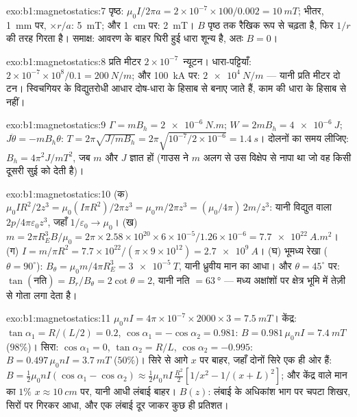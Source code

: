 \begin{solution}{exo:b1:magnetostatics:7}
पृष्ठ: $\mu_0I/2\pi a = 2 \times 10^{-7} \times 100/0.002 = \qty{10}{mT}$; भीतर,
\qty{1}{mm} पर, $\times r/a$: \qty{5}{mT}; और \qty{1}{cm} पर: \qty{2}{mT}। $B$ पृष्ठ तक
रैखिक रूप से चढ़ता है, फिर $1/r$ की तरह गिरता है। समाक्ष: आवरण के बाहर घिरी
हुई धारा शून्य है, अतः $B = 0$।
\end{solution}

\begin{solution}{exo:b1:magnetostatics:8}
प्रति मीटर $2 \times 10^{-7}$~न्यूटन। धारा-पट्टियाँ: $2 \times 10^{-7} \times 10^8/0.1 = \qty{200}{N/m}$;
और \qty{100}{kA} पर: $\qty{2e4}{N/m}$ --- यानी प्रति मीटर दो टन। स्विचगियर
के विद्युतरोधी आधार दोष-धारा के हिसाब से बनाए जाते हैं, काम की धारा के
हिसाब से नहीं।
\end{solution}

\begin{solution}{exo:b1:magnetostatics:9}
$\Gamma = mB_h = \qty{2e-6}{N.m}$; $W = 2mB_h = \qty{4e-6}{J}$; $J\ddot\theta =
-mB_h\theta$: $T = 2\pi\sqrt{J/mB_h} = 2\pi\sqrt{10^{-7}/2 \times 10^{-6}} =
\qty{1.4}{s}$। दोलनों का समय लीजिए: $B_h = 4\pi^2J/mT^2$, जब $m$ और
$J$ ज्ञात हों (गाउस ने $m$ अलग से उस विक्षेप से नापा था जो वह किसी
दूसरी सुई को देती है)।
\end{solution}

\begin{solution}{exo:b1:magnetostatics:10}
(क) $\mu_0IR^2/2z^3 = \mu_0(I\pi R^2)/2\pi z^3 = \mu_0m/2\pi z^3 = (\mu_0/4\pi)\,2m/z^3$:
यानी विद्युत वाला $2p/4\pi\varepsilon_0z^3$, जहाँ $1/\varepsilon_0 \to \mu_0$। (ख) $m = 2\pi R_E^3B/
\mu_0 = 2\pi \times 2.58 \times 10^{20} \times 6 \times 10^{-5}/1.26 \times 10^{-6} = \qty{7.7e22}{A.m^2}$।
(ग) $I = m/\pi R^2 = 7.7 \times 10^{22}/(\pi \times 9 \times 10^{12}) = \qty{2.7e9}{A}$। (घ)
भूमध्य रेखा ($\theta = 90^\circ$): $B_\theta = \mu_0m/4\pi R_E^3 = \qty{3e-5}{T}$, यानी
ध्रुवीय मान का आधा। और $\theta = 45^\circ$ पर: $\tan(\text{नति}) = B_r/B_\theta = 2\cot\theta = 2$,
यानी नति $= \qty{63}{\degree}$ --- मध्य अक्षांशों पर क्षेत्र भूमि में तेज़ी
से गोता लगा देता है।
\end{solution}

\begin{solution}{exo:b1:magnetostatics:11}
$\mu_0nI = 4\pi \times 10^{-7} \times 2000 \times 3 = \qty{7.5}{mT}$। केंद्र: $\tan\alpha_1 =
R/(L/2) = 0.2$, $\cos\alpha_1 = -\cos\alpha_2 = 0.981$: $B = 0.981\,\mu_0nI =
\qty{7.4}{mT}$ ($98\%$)। सिरा: $\cos\alpha_1 = 0$, $\tan\alpha_2 = R/L$, $\cos\alpha_2 =
-0.995$: $B = 0.497\,\mu_0nI = \qty{3.7}{mT}$ ($50\%$)। सिरे से आगे $x$ पर
बाहर, जहाँ दोनों सिरे एक ही ओर हैं: $B = \tfrac12\mu_0nI(\cos\alpha_1 - \cos\alpha_2)
\approx \tfrac12\mu_0nI\,\tfrac{R^2}{2}[1/x^2 - 1/(x + L)^2]$; और केंद्र वाले मान का
$1\%$ $x \approx \qty{10}{cm}$ पर, यानी आधी लंबाई बाहर। $B(z)$: लंबाई के
अधिकांश भाग पर चपटा शिखर, सिरों पर गिरकर आधा, और एक लंबाई दूर जाकर कुछ ही
प्रतिशत।
\end{solution}

